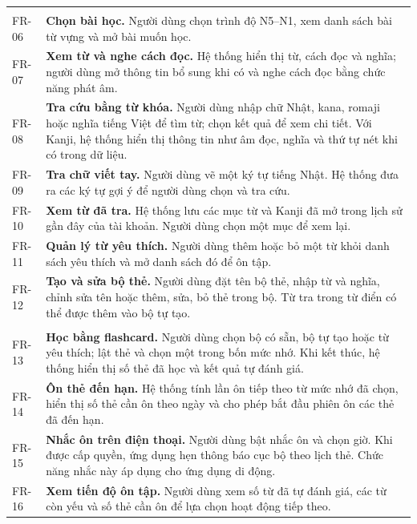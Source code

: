 \begin{longtable}{@{}>{\raggedright\arraybackslash}p{3.4cm}p{12cm}@{}}
  \multicolumn{2}{@{}l}{\textbf{2. Học từ vựng và tra cứu}}\\*
  FR-06 & \textbf{Chọn bài học.} Người dùng chọn trình độ N5--N1, xem danh sách bài từ vựng và mở bài muốn học. \\
  FR-07 & \textbf{Xem từ và nghe cách đọc.} Hệ thống hiển thị từ, cách đọc và nghĩa; người dùng mở thông tin bổ sung khi có và nghe cách đọc bằng chức năng phát âm. \\
  FR-08 & \textbf{Tra cứu bằng từ khóa.} Người dùng nhập chữ Nhật, kana, romaji hoặc nghĩa tiếng Việt để tìm từ; chọn kết quả để xem chi tiết. Với Kanji, hệ thống hiển thị thông tin như âm đọc, nghĩa và thứ tự nét khi có trong dữ liệu. \\
  FR-09 & \textbf{Tra chữ viết tay.} Người dùng vẽ một ký tự tiếng Nhật. Hệ thống đưa ra các ký tự gợi ý để người dùng chọn và tra cứu. \\
  FR-10 & \textbf{Xem từ đã tra.} Hệ thống lưu các mục từ và Kanji đã mở trong lịch sử gần đây của tài khoản. Người dùng chọn một mục để xem lại. \\
  FR-11 & \textbf{Quản lý từ yêu thích.} Người dùng thêm hoặc bỏ một từ khỏi danh sách yêu thích và mở danh sách đó để ôn tập. \\
  FR-12 & \textbf{Tạo và sửa bộ thẻ.} Người dùng đặt tên bộ thẻ, nhập từ và nghĩa, chỉnh sửa tên hoặc thêm, sửa, bỏ thẻ trong bộ. Từ tra trong từ điển có thể được thêm vào bộ tự tạo. \\
  \midrule

  \multicolumn{2}{@{}l}{\textbf{3. Flashcard và lịch ôn tập}}\\*
  FR-13 & \textbf{Học bằng flashcard.} Người dùng chọn bộ có sẵn, bộ tự tạo hoặc từ yêu thích; lật thẻ và chọn một trong bốn mức nhớ. Khi kết thúc, hệ thống hiển thị số thẻ đã học và kết quả tự đánh giá. \\
  FR-14 & \textbf{Ôn thẻ đến hạn.} Hệ thống tính lần ôn tiếp theo từ mức nhớ đã chọn, hiển thị số thẻ cần ôn theo ngày và cho phép bắt đầu phiên ôn các thẻ đã đến hạn. \\
  FR-15 & \textbf{Nhắc ôn trên điện thoại.} Người dùng bật nhắc ôn và chọn giờ. Khi được cấp quyền, ứng dụng hẹn thông báo cục bộ theo lịch thẻ. Chức năng nhắc này áp dụng cho ứng dụng di động. \\
  FR-16 & \textbf{Xem tiến độ ôn tập.} Người dùng xem số từ đã tự đánh giá, các từ còn yếu và số thẻ cần ôn để lựa chọn hoạt động tiếp theo. \\
  \midrule


\end{longtable}
